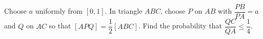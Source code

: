 Choose $a$ uniformly from $[0,1]$. In triangle $ABC$, choose $P$ on $AB$ with $\dfrac{PB}{PA}=a$ and $Q$ on $AC$ so that $[APQ]=\dfrac{1}{2}[ABC]$. Find the probability that $\dfrac{QC}{QA}\le\dfrac{1}{4}$.
